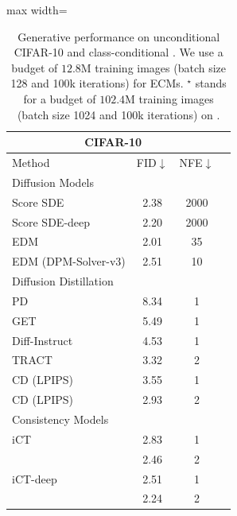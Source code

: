 

\begin{table}[t!]
\caption{Generative performance on unconditional CIFAR-10 and class-conditional \imgnet. We use a budget of $12.8\mathrm{M}$ training images (batch size 128 and 100k iterations) for ECMs. $^\star$ stands for a budget of $102.4\mathrm{M}$ training images (batch size 1024 and 100k iterations) on \imgnet.}
\vspace{5pt}
\centering
\small
\begin{minipage}[t]{0.49\linewidth}
\centering
\setlength{\tabcolsep}{5pt} 
\renewcommand{\arraystretch}{1.00} %
\begin{adjustbox}{max width=\textwidth}
    \begin{tabular}{@{}lccc@{}}
    \toprule
    \multicolumn{3}{c}{CIFAR-10} \\ 
    \midrule
    Method & FID$\downarrow$ & NFE$\downarrow$ \\ 
    \midrule
    {\color{gray} Diffusion Models} & ~ & ~ \\ 
    \midrule
    Score SDE \citep{song2020score} & 2.38 & 2000 \\ 
    Score SDE-deep \citep{song2020score} & 2.20 & 2000 \\ 
    EDM \citep{Karras2022edm} & 2.01 & 35 \\ 
    EDM (DPM-Solver-v3) \citep{zheng2024dpm} & 2.51 & 10 \\ 
    \midrule
    {\color{gray} Diffusion Distillation} & ~ & ~ \\ 
    \midrule
    PD \citep{salimans2022progressive} & 8.34 & 1 \\ 
    GET~\citep{geng2024one}  & 5.49 & 1 \\
    Diff-Instruct~\citep{di}  & 4.53 & 1 \\
    TRACT \citep{berthelot2023tract} & 3.32 & 2 \\
    CD (LPIPS) \citep{cm} & 3.55 & 1 \\ 
    CD (LPIPS) \citep{cm} & 2.93 & 2 \\ 
    \midrule
    {\color{gray} Consistency Models} & ~ & ~ \\ 
    \midrule
    iCT~\citep{ict}      & 2.83 & 1 \\ 
                         & 2.46 & 2 \\
    iCT-deep~\citep{ict} & 2.51 & 1 \\ 
                         & 2.24 & 2 \\ 
    \midrule

\end{tabular}
\end{adjustbox}
\end{minipage}
\end{table}
